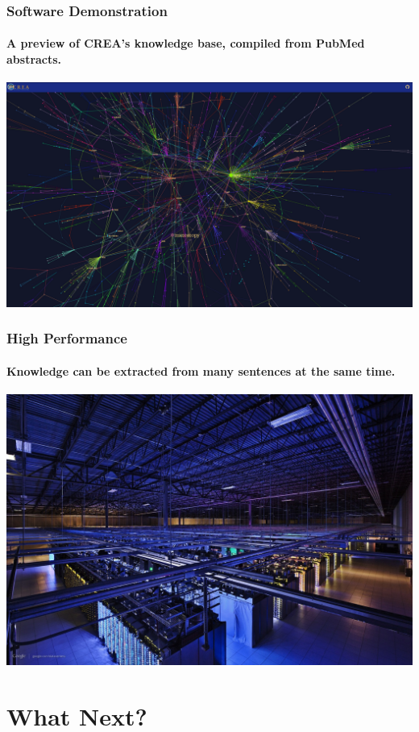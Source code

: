 \documentclass[mathserif, aspectratio=169]{beamer}
\begin{document}
\begin{frame}

\frametitle{Software Demonstration}
\framesubtitle{A preview of CREA's knowledge base, compiled from PubMed abstracts.}

\centering
\href{http://markfarrell.ca/creal}{
\includegraphics[height=.75\textheight]{images/results}
}

\end{frame}

\begin{frame}

\frametitle{High Performance}
\framesubtitle{Knowledge can be extracted from many sentences at the same time.}

\centering

\includegraphics[height=.75\textheight]{images/parallel.jpg}

\end{frame}

\section{What Next?}
\end{document}

